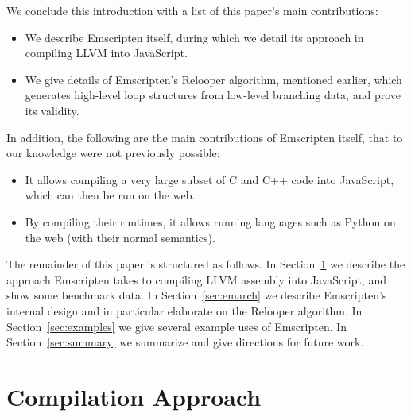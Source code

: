 \documentclass[preprint,10pt]{sigplanconf}
\begin{document}
We conclude this introduction with a list of this paper's main contributions:
\begin{itemize}
\item We describe Emscripten itself, during
      which we detail its approach in compiling LLVM into JavaScript.
\item We give details of Emscripten's Relooper algorithm, mentioned earlier, which generates
      high-level loop structures from low-level branching data, and prove
      its validity.
\end{itemize}
In addition, the following are the main contributions of Emscripten
itself, that to our knowledge were not previously possible:
\begin{itemize}
\item It allows compiling a very large subset of C and C++ code into
      JavaScript, which can then be run on the web.
\item By compiling their runtimes, it allows running languages such as Python
      on the web (with their normal semantics).
\end{itemize}

The remainder of this paper is structured as follows. In Section~\ref{sec:compapp} we
describe the approach Emscripten takes to compiling LLVM assembly into JavaScript,
and show some benchmark data.
In Section~\ref{sec:emarch} we describe Emscripten's internal design and in
particular elaborate on the Relooper algorithm.
In Section~\ref{sec:examples} we give several example uses of
Emscripten. In Section~\ref{sec:summary} we summarize and give directions for future
work.

\section{Compilation Approach}
\label{sec:compapp}
\end{document}
